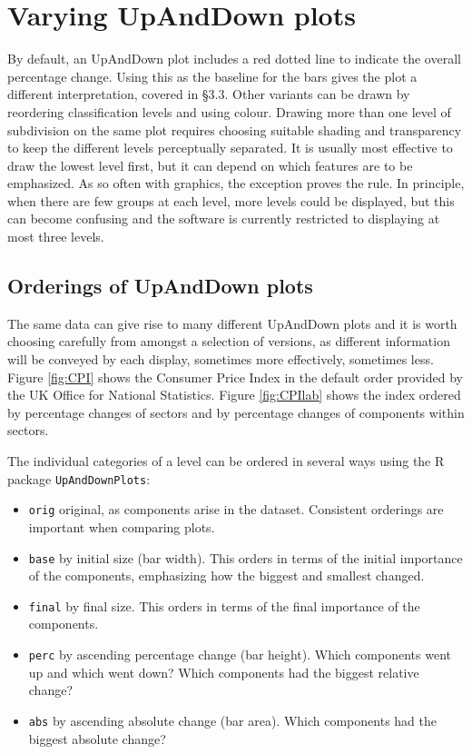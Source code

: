 \hypertarget{varying-upanddown-plots}{%
\section{Varying UpAndDown plots}\label{varying-upanddown-plots}}

By default, an UpAndDown plot includes a red dotted line to indicate the overall percentage change. Using this as the baseline for the bars gives the plot a different interpretation, covered in §3.3. Other variants can be drawn by reordering classification levels and using colour. Drawing more than one level of subdivision on the same plot requires choosing suitable shading and transparency to keep the different levels perceptually separated. It is usually most effective to draw the lowest level first, but it can depend on which features are to be emphasized. As so often with graphics, the exception proves the rule. In principle, when there are few groups at each level, more levels could be displayed, but this can become confusing and the software is currently restricted to displaying at most three levels.

\hypertarget{orderings-of-upanddown-plots}{%
\subsection{Orderings of UpAndDown plots}\label{orderings-of-upanddown-plots}}

The same data can give rise to many different UpAndDown plots and it is worth choosing carefully from amongst a selection of versions, as different information will be conveyed by each display, sometimes more effectively, sometimes less. Figure \ref{fig:CPI} shows the Consumer Price Index in the default order provided by the UK Office for National Statistics. Figure \ref{fig:CPIlab} shows the index ordered by percentage changes of sectors and by percentage changes of components within sectors.

The individual categories of a level can be ordered in several ways using the R package \texttt{UpAndDownPlots}:

\begin{itemize}
\tightlist
\item
  \texttt{orig} original, as components arise in the dataset. Consistent orderings are important when comparing plots.
\item
  \texttt{base} by initial size (bar width). This orders in terms of the initial importance of the components, emphasizing how the biggest and smallest changed.
\item
  \texttt{final} by final size. This orders in terms of the final importance of the components.
\item
  \texttt{perc} by ascending percentage change (bar height). Which components went up and which went down? Which components had the biggest relative change?
\item
  \texttt{abs} by ascending absolute change (bar area). Which components had the biggest absolute change?
\end{itemize}

